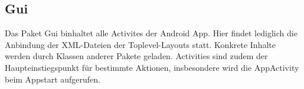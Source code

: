 \label{module:gui}\subsection{Gui}
Das Paket Gui binhaltet alle Activites der Android App. Hier findet lediglich die Anbindung der XML-Dateien der Toplevel-Layouts statt. Konkrete Inhalte werden durch Klassen anderer Pakete geladen. Activities sind zudem der Haupteinstiegspunkt für bestimmte Aktionen, insbesondere wird die AppActivity beim Appstart aufgerufen.